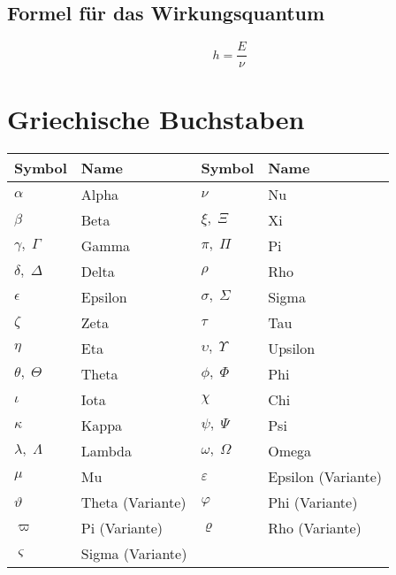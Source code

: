 \documentclass{article}
\begin{document}
\subsection{Formel für das Wirkungsquantum}
\begin{equation}
    h = \frac{E}{\nu}
\end{equation}


\section{Griechische Buchstaben}

\begin{center}
\begin{tabular}{ll|ll}
    \textbf{Symbol} & \textbf{Name} & \textbf{Symbol} & \textbf{Name} \\
    \hline
    $\alpha$ & Alpha & $\nu$ & Nu \\
    $\beta$ & Beta & $\xi,\;\Xi$ & Xi \\
    $\gamma,\;\Gamma$ & Gamma & $\pi,\;\Pi$ & Pi \\
    $\delta,\;\Delta$ & Delta & $\rho$ & Rho \\
    $\epsilon$ & Epsilon & $\sigma,\;\Sigma$ & Sigma \\
    $\zeta$ & Zeta & $\tau$ & Tau \\
    $\eta$ & Eta & $\upsilon,\;\Upsilon$ & Upsilon \\
    $\theta,\;\Theta$ & Theta & $\phi,\;\Phi$ & Phi \\
    $\iota$ & Iota & $\chi$ & Chi \\
    $\kappa$ & Kappa & $\psi,\;\Psi$ & Psi \\
    $\lambda,\;\Lambda$ & Lambda & $\omega,\;\Omega$ & Omega \\
    $\mu$ & Mu & $\varepsilon$ & Epsilon (Variante) \\
    $\vartheta$ & Theta (Variante) & $\varphi$ & Phi (Variante) \\
    $\varpi$ & Pi (Variante) & $\varrho$ & Rho (Variante) \\
    $\varsigma$ & Sigma (Variante) & & \\
\end{tabular}
\end{center}
\end{document}
